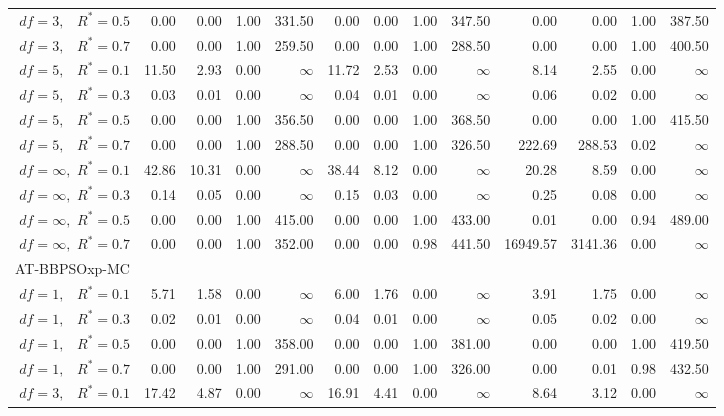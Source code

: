 \documentclass[cmbright]{staauth}
\begin{document}
\begin{table}[ht]
{\begin{tabular}{r|rrrr|rrrr|rrrr}
  $df = 3,\enspace$ $R^* =0.5$ & 0.00 & 0.00 & 1.00 & 331.50 & 0.00 & 0.00 & 1.00 & 347.50 & 0.00 & 0.00 & 1.00 & 387.50 \\
  $df = 3,\enspace$ $R^* =0.7$ & 0.00 & 0.00 & 1.00 & 259.50 & 0.00 & 0.00 & 1.00 & 288.50 & 0.00 & 0.00 & 1.00 & 400.50 \\
  $df = 5,\enspace$ $R^* =0.1$ & 11.50 & 2.93 & 0.00 & $\infty$ & 11.72 & 2.53 & 0.00 & $\infty$ & 8.14 & 2.55 & 0.00 & $\infty$ \\
  $df = 5,\enspace$ $R^* =0.3$ & 0.03 & 0.01 & 0.00 & $\infty$ & 0.04 & 0.01 & 0.00 & $\infty$ & 0.06 & 0.02 & 0.00 & $\infty$ \\
  $df = 5,\enspace$ $R^* =0.5$ & 0.00 & 0.00 & 1.00 & 356.50 & 0.00 & 0.00 & 1.00 & 368.50 & 0.00 & 0.00 & 1.00 & 415.50 \\
  $df = 5,\enspace$ $R^* =0.7$ & 0.00 & 0.00 & 1.00 & 288.50 & 0.00 & 0.00 & 1.00 & 326.50 & 222.69 & 288.53 & 0.02 & $\infty$ \\
  $df = \infty,$ $R^* =0.1$ & 42.86 & 10.31 & 0.00 & $\infty$ & 38.44 & 8.12 & 0.00 & $\infty$ & 20.28 & 8.59 & 0.00 & $\infty$ \\
  $df = \infty,$ $R^* =0.3$ & 0.14 & 0.05 & 0.00 & $\infty$ & 0.15 & 0.03 & 0.00 & $\infty$ & 0.25 & 0.08 & 0.00 & $\infty$ \\
  $df = \infty,$ $R^* =0.5$ & 0.00 & 0.00 & 1.00 & 415.00 & 0.00 & 0.00 & 1.00 & 433.00 & 0.01 & 0.00 & 0.94 & 489.00 \\
  $df = \infty,$ $R^* =0.7$ & 0.00 & 0.00 & 1.00 & 352.00 & 0.00 & 0.00 & 0.98 & 441.50 & 16949.57 & 3141.36 & 0.00 & $\infty$ \\
\hline
\multicolumn{1}{l|}{AT-BBPSOxp-MC} &&&&&&&&&&&&\\
  $df = 1,\enspace$ $R^* =0.1$ & 5.71 & 1.58 & 0.00 & $\infty$ & 6.00 & 1.76 & 0.00 & $\infty$ & 3.91 & 1.75 & 0.00 & $\infty$ \\
  $df = 1,\enspace$ $R^* =0.3$ & 0.02 & 0.01 & 0.00 & $\infty$ & 0.04 & 0.01 & 0.00 & $\infty$ & 0.05 & 0.02 & 0.00 & $\infty$ \\
  $df = 1,\enspace$ $R^* =0.5$ & 0.00 & 0.00 & 1.00 & 358.00 & 0.00 & 0.00 & 1.00 & 381.00 & 0.00 & 0.00 & 1.00 & 419.50 \\
  $df = 1,\enspace$ $R^* =0.7$ & 0.00 & 0.00 & 1.00 & 291.00 & 0.00 & 0.00 & 1.00 & 326.00 & 0.00 & 0.01 & 0.98 & 432.50 \\
  $df = 3,\enspace$ $R^* =0.1$ & 17.42 & 4.87 & 0.00 & $\infty$ & 16.91 & 4.41 & 0.00 & $\infty$ & 8.64 & 3.12 & 0.00 & $\infty$ \\

\end{tabular}}
\end{table}
\end{document}
